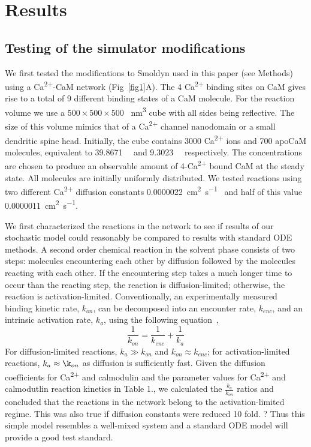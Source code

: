 \documentclass[10pt,letterpaper]{article}
\begin{document}
\section*{Results}
\subsection*{Testing of the simulator modifications}
We first tested the modifications to Smoldyn used in this paper (see Methods) using a Ca\textsuperscript{2+}-CaM network (Fig~\ref{fig1}A). The 4 Ca\textsuperscript{2+} binding sites on CaM gives rise to a total of 9 different binding states of a CaM molecule. For the reaction volume we use a $500\times500\times500$ \SI{}{\cubic\nm} cube with all sides being reflective. The size of this volume mimics that of a Ca\textsuperscript{2+} channel nanodomain or a small dendritic spine head. Initially, the cube contains 3000 Ca\textsuperscript{2+} ions and 700 apoCaM molecules, equivalent to \SI{39.8671}{\micro\Molar} and \SI{9.3023}{\micro\Molar} respectively. The concentrations are chosen to produce an observable amount of 4-Ca\textsuperscript{2+} bound CaM at the steady state. All molecules are initially uniformly distributed. We tested reactions using two different Ca\textsuperscript{2+} diffusion constants \SI{0.0000022}{\square\cm\per\s}~\cite{Keller:2008ez} and half of this value \SI{0.0000011}{\square\cm\per\s}.

We first characterized the reactions in the network to see if results of our stochastic model could reasonably be compared to results with standard ODE methods. A second order chemical reaction in the solvent phase consists of two steps: molecules encountering each other by diffusion followed by the molecules reacting with each other. If the encountering step takes a much longer time to occur than the reacting step, the reaction is diffusion-limited; otherwise, the reaction is activation-limited. Conventionally, an experimentally measured binding kinetic rate, $k_{on}$, can be decomposed into an encounter rate, $k_{enc}$, and an intrinsic activation rate, $k_{a}$, using the following equation~\cite{},
\begin{equation}\frac{1}{k_{on}}=\frac{1}{k_{enc}}+\frac{1}{k_a}\end{equation}
For diffusion-limited reactions, $k_a \gg k_{on}$ and $k_{on} \approx k_{enc}$; for activation-limited reactions, $k_a \approx \k_{on}$ as diffusion is sufficiently fast. Given the diffusion coefficients for Ca\textsuperscript{2+} and calmodulin and the parameter values for Ca\textsuperscript{2+} and calmodutlin reaction kinetics in Table 1., we calculated the $\frac{k_a}{k_{on}}$ ratios and concluded that the reactions in the network belong to the activation-limited regime. This was also true if diffusion constants were reduced 10 fold. ? Thus this simple model resembles a well-mixed system and a standard ODE model will provide a good test standard. 
\end{document}
